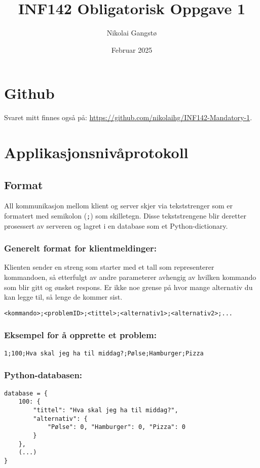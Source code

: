 \documentclass[hidelinks]{article}
\title{INF142 Obligatorisk Oppgave 1}
\author{Nikolai Gangstø}
\date{Februar 2025}
\begin{document}
\maketitle

\tableofcontents

\section*{Github}
Svaret mitt finnes også på: \url{https://github.com/nikolaihg/INF142-Mandatory-1}.

\newpage

\section{Applikasjonsnivåprotokoll}

\subsection{Format}
All kommunikasjon mellom klient og server skjer via tekststrenger som er formatert med semikolon (\texttt{;}) som skilletegn. Disse tekststrengene blir deretter prosessert av serveren og lagret i en database som et Python-dictionary. 

\subsubsection*{Generelt format for klientmeldinger:}
Klienten sender en streng som starter med et tall som representerer kommandoen, så etterfulgt av andre parameterer avhengig av hvilken kommando som blir gitt og ønsket respons. Er ikke noe grense på hvor mange alternativ du kan legge til, så lenge de kommer sist.
\begin{verbatim}
<kommando>;<problemID>;<tittel>;<alternativ1>;<alternativ2>;...
\end{verbatim}

\subsubsection*{Eksempel for å opprette et problem:}
\begin{verbatim}
1;100;Hva skal jeg ha til middag?;Pølse;Hamburger;Pizza
\end{verbatim}

\subsubsection*{Python-databasen:}
\begin{verbatim}
database = {
    100: {
        "tittel": "Hva skal jeg ha til middag?",
        "alternativ": {
            "Pølse": 0, "Hamburger": 0, "Pizza": 0
        }
    },
    (...)
}
\end{verbatim}
\end{document}
